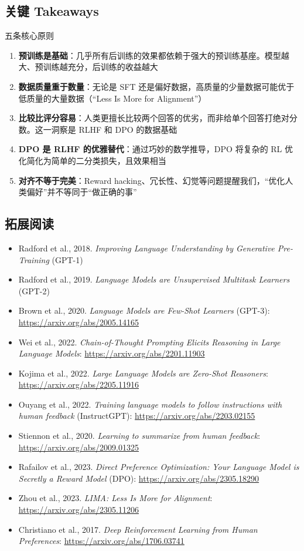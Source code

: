 \documentclass[a4paper]{article}
\begin{document}
\subsection{关键 Takeaways}

\begin{importantbox}{五条核心原则}
\begin{enumerate}
    \item \textbf{预训练是基础}：几乎所有后训练的效果都依赖于强大的预训练基座。模型越大、预训练越充分，后训练的收益越大
    \item \textbf{数据质量重于数量}：无论是 SFT 还是偏好数据，高质量的少量数据可能优于低质量的大量数据（``Less Is More for Alignment''）
    \item \textbf{比较比评分容易}：人类更擅长比较两个回答的优劣，而非给单个回答打绝对分数。这一洞察是 RLHF 和 DPO 的数据基础
    \item \textbf{DPO 是 RLHF 的优雅替代}：通过巧妙的数学推导，DPO 将复杂的 RL 优化简化为简单的二分类损失，且效果相当
    \item \textbf{对齐不等于完美}：Reward hacking、冗长性、幻觉等问题提醒我们，``优化人类偏好''并不等同于``做正确的事''
\end{enumerate}
\end{importantbox}

\subsection{拓展阅读}

\begin{itemize}
    \item Radford et al., 2018. \textit{Improving Language Understanding by Generative Pre-Training} (GPT-1)
    \item Radford et al., 2019. \textit{Language Models are Unsupervised Multitask Learners} (GPT-2)
    \item Brown et al., 2020. \textit{Language Models are Few-Shot Learners} (GPT-3): \url{https://arxiv.org/abs/2005.14165}
    \item Wei et al., 2022. \textit{Chain-of-Thought Prompting Elicits Reasoning in Large Language Models}: \url{https://arxiv.org/abs/2201.11903}
    \item Kojima et al., 2022. \textit{Large Language Models are Zero-Shot Reasoners}: \url{https://arxiv.org/abs/2205.11916}
    \item Ouyang et al., 2022. \textit{Training language models to follow instructions with human feedback} (InstructGPT): \url{https://arxiv.org/abs/2203.02155}
    \item Stiennon et al., 2020. \textit{Learning to summarize from human feedback}: \url{https://arxiv.org/abs/2009.01325}
    \item Rafailov et al., 2023. \textit{Direct Preference Optimization: Your Language Model is Secretly a Reward Model} (DPO): \url{https://arxiv.org/abs/2305.18290}
    \item Zhou et al., 2023. \textit{LIMA: Less Is More for Alignment}: \url{https://arxiv.org/abs/2305.11206}
    \item Christiano et al., 2017. \textit{Deep Reinforcement Learning from Human Preferences}: \url{https://arxiv.org/abs/1706.03741}
\end{itemize}
\end{document}
